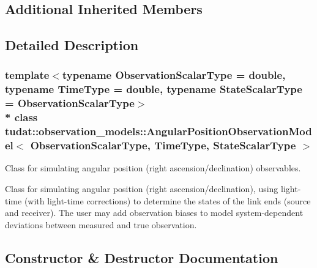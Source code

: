 \subsection*{Additional Inherited Members}


\subsection{Detailed Description}
\subsubsection*{template$<$typename Observation\+Scalar\+Type = double, typename Time\+Type = double, typename State\+Scalar\+Type = Observation\+Scalar\+Type$>$\\*
class tudat\+::observation\+\_\+models\+::\+Angular\+Position\+Observation\+Model$<$ Observation\+Scalar\+Type, Time\+Type, State\+Scalar\+Type $>$}

Class for simulating angular position (right ascension/declination) observables. 

Class for simulating angular position (right ascension/declination), using light-\/time (with light-\/time corrections) to determine the states of the link ends (source and receiver). The user may add observation biases to model system-\/dependent deviations between measured and true observation. 

\subsection{Constructor \& Destructor Documentation}
